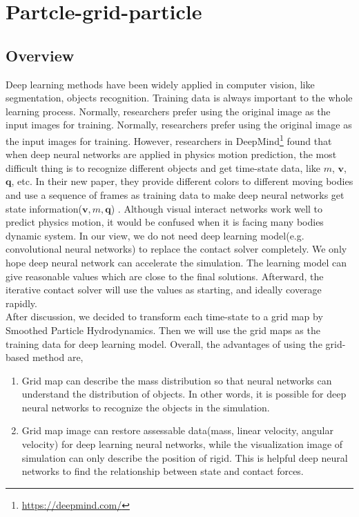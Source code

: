 \chapter{Partcle-grid-particle}
\section{Overview}
    Deep learning methods have been widely applied in computer vision, like segmentation, objects recognition. Training data is always important to the whole learning process. Normally, researchers prefer using the original image as the input images for training. Normally, researchers prefer using the original image as the input images for training. However, researchers in DeepMind\footnote{\url{https://deepmind.com/}} found that when deep neural networks are applied in physics motion prediction, the most difficult thing is to recognize different objects and get time-state data, like $m$, $\pmb{v}$, $\pmb{q}$, etc. In their new paper, they provide different colors to different moving bodies and use a sequence of frames as training data to make deep neural networks get state information($\pmb{v}, m, \pmb{q}$) \cite{DBLP:journals/corr/WattersTWPBZ17}.  Although visual interact networks work well to predict physics motion, it would be confused when it is facing many bodies dynamic system. In our view, we do not need deep learning model(e.g. convolutional neural networks) to replace the contact solver completely. We only hope deep neural network can accelerate the simulation. The learning model can give reasonable values which are close to the final solutions. Afterward, the iterative contact solver will use the values as starting, and ideally coverage rapidly. \\

    After discussion, we decided to transform each time-state to a grid map by Smoothed Particle Hydrodynamics. Then we will use the grid maps as the training data for deep learning model. Overall, the advantages of using the grid-based method are,
    \begin{enumerate}
        \item Grid map can describe the mass distribution so that neural networks can understand the distribution of objects. In other words, it is possible for deep neural networks to recognize the objects in the simulation.
        \item Grid map image can restore assessable data(mass, linear velocity, angular velocity) for deep learning neural networks, while the visualization image of simulation can only describe the position of rigid. This is helpful deep neural networks to find the relationship between state and contact forces.
    \end{enumerate}

